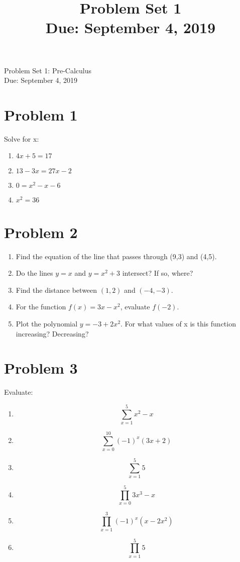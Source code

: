 \documentclass[11pt]{article}
\title{Problem Set 1\\ Due: September 4, 2019}%
\theoremstyle{definition}
\theoremstyle{remark}
\begin{document}
\begin{center}
{\huge Problem Set 1: Pre-Calculus}\\[5pt]
Due: September 4, 2019
\end{center}

\section*{Problem 1}
Solve for x:
\begin{enumerate}
\item $4x + 5 = 17$
\item $13 - 3x = 27x - 2$
\item $0 = x^2 - x - 6$
\item $x^2 = 36$\\[5pt]
\end{enumerate}

\section*{Problem 2}
\begin{enumerate}
\item Find the equation of the line that passes through (9,3) and (4,5).
\item Do the lines $y=x$ and $y=x^2+3$ intersect?  If so, where?
\item Find the distance between $(1,2)$ and $(-4,-3)$.
\item For the function $f(x) = 3x - x^2$, evaluate $f(-2)$.
\item Plot the polynomial $y = -3 + 2x^2$. For what values of x is this function increasing? Decreasing?\\[5pt]
\end{enumerate}

\section*{Problem 3}
Evaluate:
\begin{enumerate}
\item $$\sum_{x=1}^{5}x^2-x$$
\item $$\sum_{x=0}^{10}(-1)^{x} (3x + 2) $$
\item $$\sum_{x=1}^{5} 5$$
\item $$\prod_{x=0}^{5}3x^3-x$$
\item $$\prod_{x=1}^{3}(-1)^{x} (x - 2x^2) $$
\item $$\prod_{x=1}^{5} 5$$
\end{enumerate}
\end{document}
